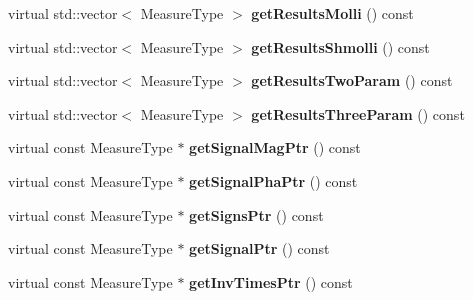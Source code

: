 \begin{DoxyCompactItemize}
\item 
\hypertarget{class_ox_1_1_test_data_a68a2cefeed3da1c1dac7a34256b9d640}{virtual std\-::vector$<$ Measure\-Type $>$ {\bfseries get\-Results\-Molli} () const }\label{class_ox_1_1_test_data_a68a2cefeed3da1c1dac7a34256b9d640}

\item 
\hypertarget{class_ox_1_1_test_data_aece21264e7f357c50e2d157f077127f5}{virtual std\-::vector$<$ Measure\-Type $>$ {\bfseries get\-Results\-Shmolli} () const }\label{class_ox_1_1_test_data_aece21264e7f357c50e2d157f077127f5}

\item 
\hypertarget{class_ox_1_1_test_data_a594d22cee0f18a220811c323d5e59ff4}{virtual std\-::vector$<$ Measure\-Type $>$ {\bfseries get\-Results\-Two\-Param} () const }\label{class_ox_1_1_test_data_a594d22cee0f18a220811c323d5e59ff4}

\item 
\hypertarget{class_ox_1_1_test_data_a958d75edb7d2b4a3ef54c7d36283fae8}{virtual std\-::vector$<$ Measure\-Type $>$ {\bfseries get\-Results\-Three\-Param} () const }\label{class_ox_1_1_test_data_a958d75edb7d2b4a3ef54c7d36283fae8}

\item 
\hypertarget{class_ox_1_1_test_data_a9f625acf214f62d6cdfee00c924ef9b0}{virtual const Measure\-Type $\ast$ {\bfseries get\-Signal\-Mag\-Ptr} () const }\label{class_ox_1_1_test_data_a9f625acf214f62d6cdfee00c924ef9b0}

\item 
\hypertarget{class_ox_1_1_test_data_aafe59c86537fb24e513443e34f2b506d}{virtual const Measure\-Type $\ast$ {\bfseries get\-Signal\-Pha\-Ptr} () const }\label{class_ox_1_1_test_data_aafe59c86537fb24e513443e34f2b506d}

\item 
\hypertarget{class_ox_1_1_test_data_a98127c877fabc49a7112489e928cda05}{virtual const Measure\-Type $\ast$ {\bfseries get\-Signs\-Ptr} () const }\label{class_ox_1_1_test_data_a98127c877fabc49a7112489e928cda05}

\item 
\hypertarget{class_ox_1_1_test_data_a7c52dbd7292dfafd5e9d95eb9d701e19}{virtual const Measure\-Type $\ast$ {\bfseries get\-Signal\-Ptr} () const }\label{class_ox_1_1_test_data_a7c52dbd7292dfafd5e9d95eb9d701e19}

\item 
\hypertarget{class_ox_1_1_test_data_ad6f19708661e0722df977b8dacbf88e7}{virtual const Measure\-Type $\ast$ {\bfseries get\-Inv\-Times\-Ptr} () const }\label{class_ox_1_1_test_data_ad6f19708661e0722df977b8dacbf88e7}


\end{DoxyCompactItemize}
